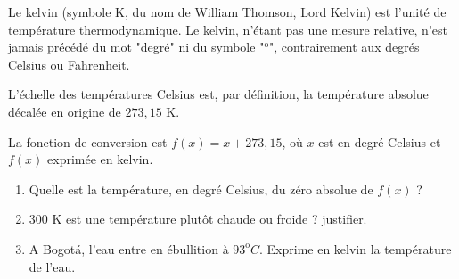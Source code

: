 
Le kelvin (symbole K, du nom de William Thomson, Lord Kelvin) est l'unité de température thermodynamique. Le kelvin, n'étant pas une mesure relative, n'est jamais précédé du mot "degré" ni du symbole "$^\text{o}$", contrairement aux degrés Celsius ou Fahrenheit. 

L'échelle des températures Celsius est, par définition, la température absolue décalée en origine de $273,15$ K. 

La fonction de conversion est $f(x)=x + 273,15$, où $x$ est en degré Celsius et $f(x)$ exprimée en kelvin.  

\begin{enumerate}
\item Quelle est la température, en degré Celsius, du zéro absolue de $f(x)$ ?
\item $300$ K est une température plutôt chaude ou froide ? justifier.
\item A Bogotá, l'eau entre en ébullition à $93^\text{o} C$. Exprime en kelvin la température de l'eau.
\end{enumerate}

